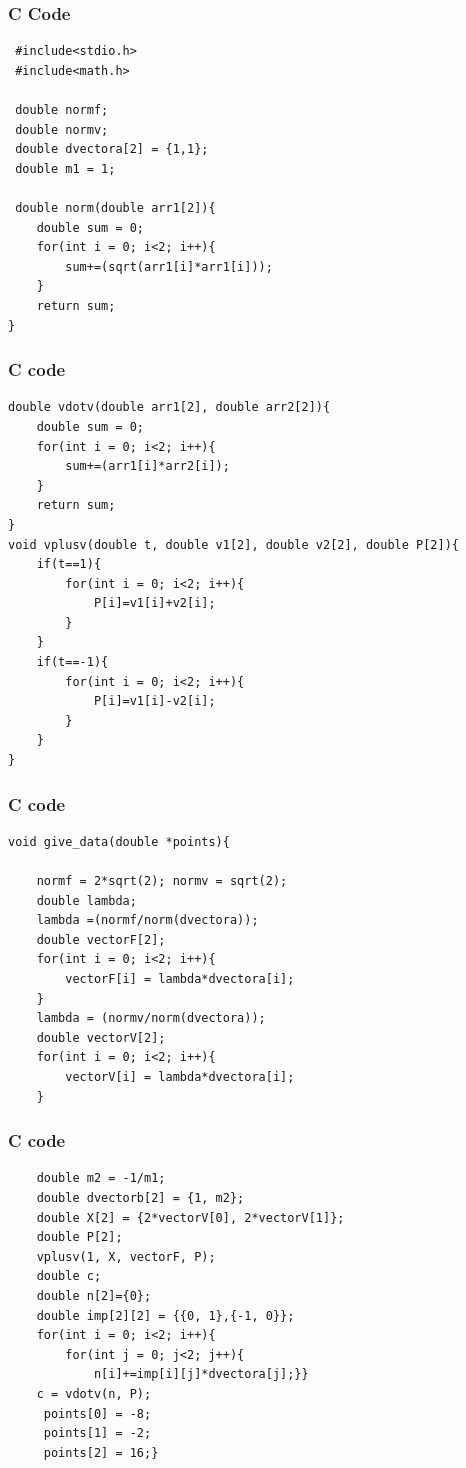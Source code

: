 \documentclass{beamer}
\begin{document}
\begin{frame}[fragile]
    \frametitle{C Code}
    \begin{lstlisting}
 #include<stdio.h>
 #include<math.h>

 double normf;
 double normv;
 double dvectora[2] = {1,1};
 double m1 = 1;

 double norm(double arr1[2]){
    double sum = 0;
    for(int i = 0; i<2; i++){
        sum+=(sqrt(arr1[i]*arr1[i]));
    }
    return sum;
}
    \end{lstlisting}
\end{frame}

\begin{frame}[fragile]
    \frametitle{C code}
    \begin{lstlisting}
double vdotv(double arr1[2], double arr2[2]){
    double sum = 0;
    for(int i = 0; i<2; i++){
        sum+=(arr1[i]*arr2[i]);
    }
    return sum;
}
void vplusv(double t, double v1[2], double v2[2], double P[2]){
    if(t==1){
        for(int i = 0; i<2; i++){
            P[i]=v1[i]+v2[i];
        }
    }
    if(t==-1){
        for(int i = 0; i<2; i++){
            P[i]=v1[i]-v2[i];
        }
    }
}
    \end{lstlisting}
\end{frame}

\begin{frame}[fragile]
    \frametitle{C code}
    \begin{lstlisting}
void give_data(double *points){

    normf = 2*sqrt(2); normv = sqrt(2);
    double lambda;
    lambda =(normf/norm(dvectora));
    double vectorF[2];
    for(int i = 0; i<2; i++){
        vectorF[i] = lambda*dvectora[i];
    }
    lambda = (normv/norm(dvectora));
    double vectorV[2];
    for(int i = 0; i<2; i++){
        vectorV[i] = lambda*dvectora[i];
    }
    \end{lstlisting}
\end{frame}

\begin{frame}[fragile]
    \frametitle{C code}
    \begin{lstlisting}
    double m2 = -1/m1;
    double dvectorb[2] = {1, m2};
    double X[2] = {2*vectorV[0], 2*vectorV[1]};
    double P[2];
    vplusv(1, X, vectorF, P);
    double c;
    double n[2]={0};
    double imp[2][2] = {{0, 1},{-1, 0}};
    for(int i = 0; i<2; i++){
        for(int j = 0; j<2; j++){
            n[i]+=imp[i][j]*dvectora[j];}}
    c = vdotv(n, P);
     points[0] = -8;
     points[1] = -2;
     points[2] = 16;}
    \end{lstlisting}
\end{frame}
\end{document}
